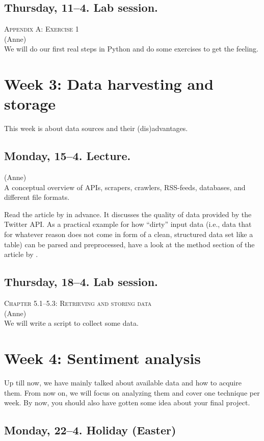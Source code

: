 \documentclass[a4paper,10pt]{report}
\begin{document}
\subsection*{Thursday, 11--4. Lab session.}
\textsc{ Appendix A: Exercise 1}\\
{\footnotesize{(Anne)}\\}
We will do our first real steps in Python and do some exercises to get the feeling. 


\section*{Week 3: Data harvesting and storage}
This week is about data sources and their (dis)advantages. 

\subsection*{Monday, 15--4. Lecture.}
{\footnotesize{(Anne)}\\}
A conceptual overview of APIs, scrapers, crawlers, RSS-feeds, databases, and different file formats.

Read the article by \cite{Morstatter2013} in advance. It discusses the quality of data provided by the Twitter API. As a practical example for how ``dirty'' input data (i.e., data that for whatever reason does not come in form of a clean, structured data set like a table) can be parsed and preprocessed, have a look at the method section of the article by \cite{Lewis2013}. 


\subsection*{Thursday, 18--4. Lab session.}
\textsc{ Chapter 5.1--5.3: Retrieving and storing data}\\
{\footnotesize{(Anne)}\\}
We will write a script to collect some data. 

\section*{Week 4: Sentiment analysis}
Up till now, we have mainly talked about available data and how to acquire them. From now on, we will focus on analyzing them and cover one technique per week. By now, you should also have gotten some idea about your final project.


\subsection*{Monday, 22--4. Holiday (Easter)}
\end{document}
